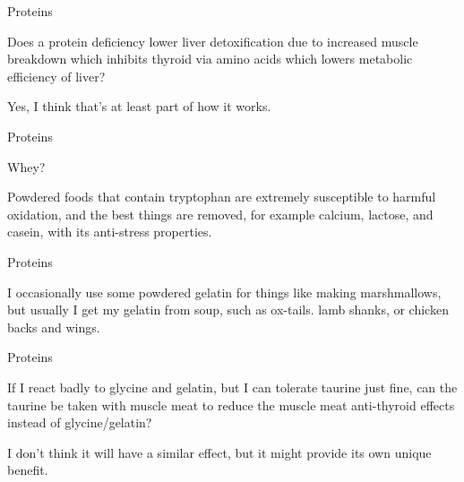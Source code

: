 \documentclass[11pt,oneside,openany,extrafontsizes]{memoir}
\begin{document}
\begin{qaexchange}{Proteins}

    \begin{question}
        Does a protein deficiency lower liver detoxification due to increased muscle breakdown which inhibits thyroid via amino acids which lowers metabolic efficiency of liver?
    \end{question}

    \begin{answer}
        Yes, I think that's at least part of how it works.
    \end{answer}
\end{qaexchange}

\begin{qaexchange}{Proteins}

    \begin{question}
        Whey?
    \end{question}

    \begin{answer}
        Powdered foods that contain tryptophan are extremely susceptible to harmful oxidation, and the best things are removed, for example calcium, lactose, and casein, with its anti-stress properties.
    \end{answer}
\end{qaexchange}

\begin{standalonequote}{Proteins}

    \begin{answer}
      I occasionally use some powdered gelatin for things like making marshmallows, but usually I get my gelatin from soup, such as ox-tails. lamb shanks, or chicken backs and wings.
    \end{answer}
\end{standalonequote}

\begin{qaexchange}{Proteins}

    \begin{question}
        If I react badly to glycine and gelatin, but I can tolerate taurine just fine, can the taurine be taken with muscle meat to reduce the muscle meat anti-thyroid effects instead of glycine/gelatin?
    \end{question}

    \begin{answer}
      I don't think it will have a similar effect, but it might provide its own unique benefit.
    \end{answer}
\end{qaexchange}
\end{document}
